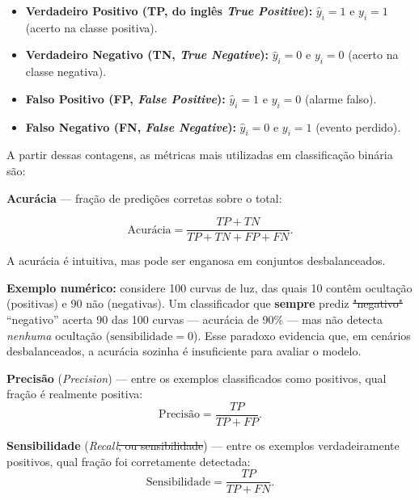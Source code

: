 \documentclass[msc]{on} %
\makeatletter
\providecommand{\DIFaddtex}[1]{{\protect\color{red}#1}} %
\providecommand{\DIFdeltex}[1]{{\protect\color{red}\sout{#1}}} %
\providecommand{\DIFaddbegin}{} %
\providecommand{\DIFaddend}{} %
\providecommand{\DIFdelbegin}{} %
\providecommand{\DIFdelend}{} %
\providecommand{\DIFadd}[1]{\texorpdfstring{\DIFaddtex{#1}}{#1}} %
\providecommand{\DIFdel}[1]{\texorpdfstring{\DIFdeltex{#1}}{}} %
\let\sout@orig\sout %
\renewcommand{\sout}[1]{\ifmmode\text{\sout@orig{\ensuremath{#1}}}\else\sout@orig{#1}\fi} %
\makeatother
\begin{document}
\begin{itemize}
	\item \textbf{Verdadeiro Positivo (TP\DIFaddbegin \DIFadd{, do inglês }\textit{\DIFadd{True Positive}}\DIFaddend ):} $\hat{y}_i = 1$ e $y_i = 1$ (acerto na classe positiva).
	\item \textbf{Verdadeiro Negativo (TN\DIFaddbegin \DIFadd{, }\textit{\DIFadd{True Negative}}\DIFaddend ):} $\hat{y}_i = 0$ e $y_i = 0$ (acerto na classe negativa).
	\item \textbf{Falso Positivo (FP\DIFaddbegin \DIFadd{, }\textit{\DIFadd{False Positive}}\DIFaddend ):} $\hat{y}_i = 1$ e $y_i = 0$ (alarme falso).
	\item \textbf{Falso Negativo (FN\DIFaddbegin \DIFadd{, }\textit{\DIFadd{False Negative}}\DIFaddend ):} $\hat{y}_i = 0$ e $y_i = 1$ (evento perdido).
\end{itemize}

A partir dessas contagens, as métricas mais utilizadas em classificação binária são:

\textbf{Acurácia} --- fração de predições corretas sobre o total:

\begin{equation}
\text{Acurácia} = \frac{TP + TN}{TP + TN + FP + FN}.
\end{equation}

A acurácia é intuitiva, mas pode ser enganosa em conjuntos desbalanceados. 

\textbf{Exemplo numérico:} considere 100 curvas de luz, das quais 10 contêm ocultação (positivas) e 90 não (negativas). Um classificador que \textbf{sempre} prediz \DIFdelbegin \DIFdel{"negativo" }\DIFdelend\ifhmode\hskip0pt\fi \DIFaddbegin \DIFadd{``negativo'' }\DIFaddend acerta 90 das 100 curvas --- acurácia de 90\% --- mas não detecta \textit{nenhuma} ocultação ($\text{sensibilidade} = 0$). Esse paradoxo evidencia que, em cenários desbalanceados, a acurácia sozinha é insuficiente para avaliar o modelo.

\textbf{Precisão} (\textit{Precision}) --- entre os exemplos classificados como positivos, qual fração é realmente positiva:
\begin{equation}
\text{Precisão} = \frac{TP}{TP + FP}.
\end{equation}

\textbf{Sensibilidade} (\textit{Recall}\DIFdelbegin \DIFdel{, ou sensibilidade}\DIFdelend ) --- entre os exemplos verdadeiramente positivos, qual fração foi corretamente detectada:
\begin{equation}
\text{Sensibilidade} = \frac{TP}{TP + FN}.
\end{equation}
\end{document}
